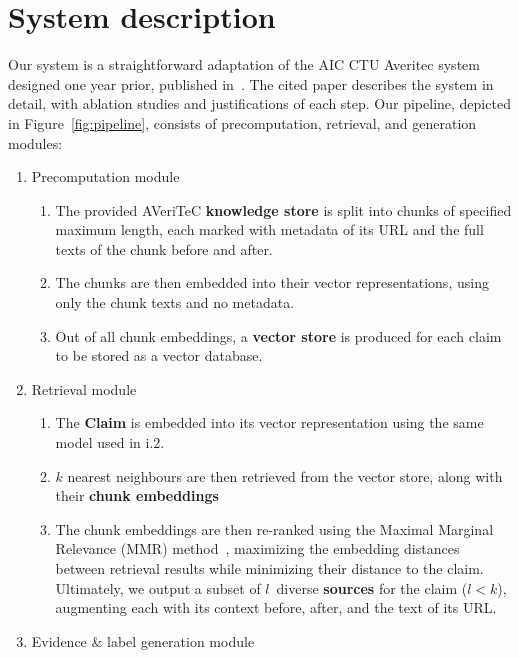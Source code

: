 
\section{System description}
\label{sec:system}

Our system is a straightforward adaptation of the AIC CTU Averitec system designed one year prior, published in~\citealt{ullrich-etal-2024-aic}.
The cited paper describes the system in detail, with ablation studies and justifications of each step.
Our pipeline, depicted in Figure~\ref{fig:pipeline}, consists of precomputation, retrieval, and generation modules:

\begin{enumerate}[label=\roman*.]  %
\item Precomputation module
\begin{enumerate}[label=\arabic*.]  %
    \item The provided AVeriTeC \textbf{knowledge store} \cite{averitec2024} is split into chunks of specified maximum length, each marked with metadata of its URL and the full texts of the chunk before and after.
    \item The chunks are then embedded into their vector representations, using only the chunk texts and no metadata.
    \item Out of all chunk embeddings, a \textbf{vector store} is produced for each claim to be stored as a vector database.
\end{enumerate}
\item Retrieval module
\begin{enumerate}[label=\arabic*.]  %
    \item The \textbf{Claim} is embedded into its vector representation using the same model used in i.2.
    \item $k$ nearest neighbours are then retrieved from the vector store, along with their \textbf{chunk embeddings}
    \item The chunk embeddings are then re-ranked using the Maximal Marginal Relevance (MMR) method~\cite{carbonell-mmr}, maximizing the embedding distances between retrieval results while minimizing their distance to the claim.
    Ultimately, we output a subset of $l$~diverse \textbf{sources} for the claim ($l<k$), augmenting each with its context before, after, and the text of its URL.
\end{enumerate}
\item Evidence \& label generation module

\end{enumerate}
